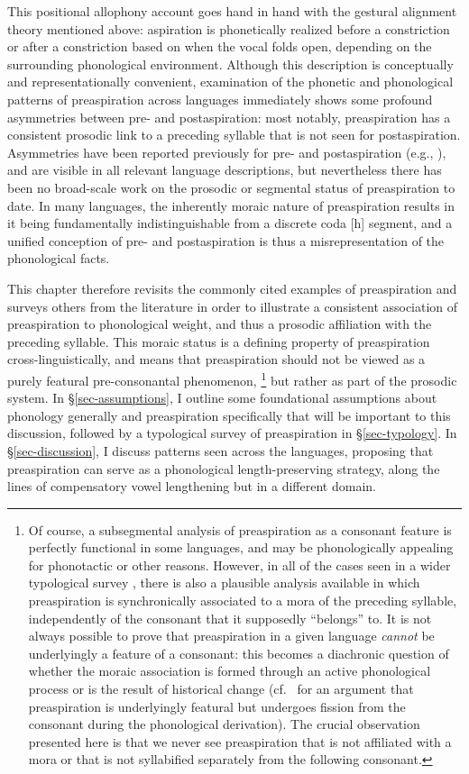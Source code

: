 \documentclass[output=paper,colorlinks,citecolor=brown]{langscibook}
\begin{document}
This positional allophony account goes hand in hand with the gestural alignment theory mentioned above: aspiration is phonetically realized before a constriction or after a constriction based on when the vocal folds open, depending on the surrounding phonological environment. Although this description is conceptually and representationally convenient, examination of the phonetic and phonological patterns of preaspiration across languages immediately shows some profound asymmetries between pre- and postaspiration: most notably, preaspiration has a consistent prosodic link to a preceding syllable that is not seen for postaspiration. Asymmetries have been reported previously for pre- and postaspiration (e.g., {\citealp[13--15]{Clayton:2010}}), and are visible in all relevant language descriptions, but nevertheless there has been no broad-scale work on the prosodic or segmental status of preaspiration to date. In many languages, the inherently moraic nature of preaspiration results in it being fundamentally indistinguishable from a discrete coda [h] segment, and a unified conception of pre- and postaspiration is thus a misrepresentation of the phonological facts.

This chapter therefore revisits the commonly cited examples of preaspiration and surveys others from the literature in order to illustrate a consistent association of preaspiration to phonological weight, and thus a prosodic affiliation with the preceding syllable. This moraic status is a defining property of preaspiration cross-linguistically, and means that preaspiration should not be viewed as a purely featural pre-consonantal phenomenon,%
\footnote{Of course, a subsegmental analysis of preaspiration as a consonant feature is perfectly functional in some languages, and may be phonologically appealing for phonotactic or other reasons. However, in all of the cases seen in a wider typological survey \citep{craioveanu-thesis}, there is also a plausible analysis available in which preaspiration is synchronically associated to a mora of the preceding syllable, independently of the consonant that it supposedly ``belongs'' to. It is not always possible to prove that preaspiration in a given language \textit{cannot} be underlyingly a feature of a consonant: this becomes a diachronic question of whether the moraic association is formed through an active phonological process or is the result of historical change (cf.\ \citealp{balsbaal2012} for an argument that preaspiration is underlyingly featural but undergoes fission from the consonant during the phonological derivation). The crucial observation presented here is that we never see preaspiration that is not affiliated with a mora or that is not syllabified separately from the following consonant.}
but rather as part of the prosodic system. In \S\ref{sec-assumptions}, I outline some foundational assumptions about phonology generally and preaspiration specifically that will be important to this discussion, followed by a typological survey of preaspiration in \S\ref{sec-typology}. In \S\ref{sec-discussion}, I discuss patterns seen across the languages, proposing that preaspiration can serve as a phonological length-preserving strategy, along the lines of compensatory vowel lengthening but in a different domain. 
\end{document}
